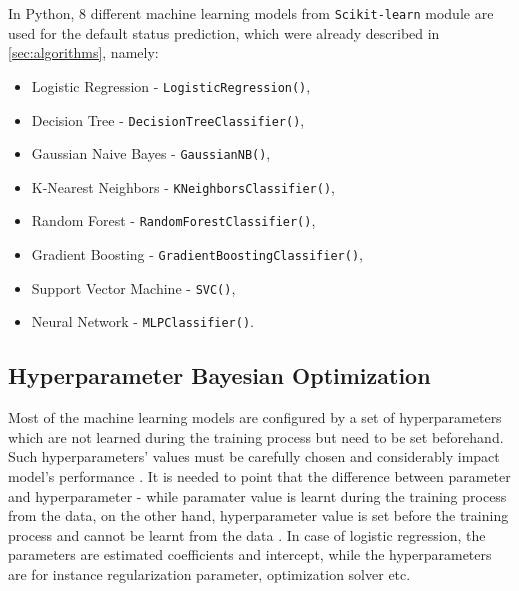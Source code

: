 In Python, 8 different machine learning models from \lstinline{Scikit-learn} module are used for the default status prediction, which were already described in \autoref{sec:algorithms}, namely:
\begin{itemize}\setlength\itemsep{0em}
\item Logistic Regression - \lstinline{LogisticRegression()},
\item Decision Tree - \lstinline{DecisionTreeClassifier()},
\item Gaussian Naive Bayes - \lstinline{GaussianNB()},
\item K-Nearest Neighbors - \lstinline{KNeighborsClassifier()},
\item Random Forest - \lstinline{RandomForestClassifier()},
\item Gradient Boosting - \lstinline{GradientBoostingClassifier()},
\item Support Vector Machine - \lstinline{SVC()},
\item Neural Network - \lstinline{MLPClassifier()}.
\end{itemize}

\subsection{Hyperparameter Bayesian Optimization}

Most of the machine learning models are configured by a set of hyperparameters which are not learned during the training process but need to be set beforehand. Such hyperparameters' values must be carefully chosen and considerably impact model's performance \citep{bischl2023hyperparameter}.
It is needed to point that the difference between parameter and hyperparameter - while paramater value is learnt during the training process from the data, on the other hand, hyperparameter value is set before the training process and cannot be learnt from the data \citep{owen2022hyperparameter}. In case of logistic regression, the parameters are estimated coefficients and intercept, while the hyperparameters are for instance regularization parameter, optimization solver etc.


